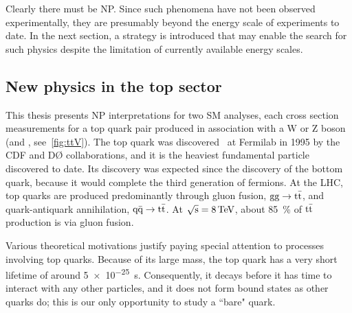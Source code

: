 Clearly there must be NP. Since such phenomena have not been observed
experimentally, they are presumably beyond the energy scale of experiments to
date. In the next section, a strategy is introduced that may enable the search
for such physics despite the limitation of currently available energy scales.

\subsection{New physics in the top sector}
This thesis presents NP interpretations for two SM analyses, each cross section
measurements for a top quark pair produced in association with a W or Z boson
(\ttW and \ttZ, see~\cref{fig:ttV}). The top quark was
discovered~\cite{PhysRevLett.74.2626,PhysRevLett.74.2422} at Fermilab in 1995 by
the CDF and D{\O} collaborations, and it is the heaviest fundamental particle
discovered to date. Its discovery was expected since the discovery of the bottom
quark, because it would complete the third generation of fermions. At the LHC,
top quarks are produced predominantly through gluon fusion, $\text{g}\text{g} \rightarrow
\text{t}\bar{\text{t}}$, and quark-antiquark annihilation, $\text{q}\bar{\text{q}} \rightarrow
\text{t}\bar{\text{t}}$. At $\sqrt{\text{s}} = \SI{8}{TeV}$, about \SI{85}{\percent} of
$\text{t}\bar{\text{t}}$ production is via gluon fusion.

Various theoretical motivations justify paying special attention to processes
involving top quarks. Because of its large mass, the top quark has a very short
lifetime of around \SI{5e-25}{s}. Consequently, it decays before it has time to
interact with any other particles, and it does not form bound states as other
quarks do; this is our only opportunity to study a ``bare" quark.

